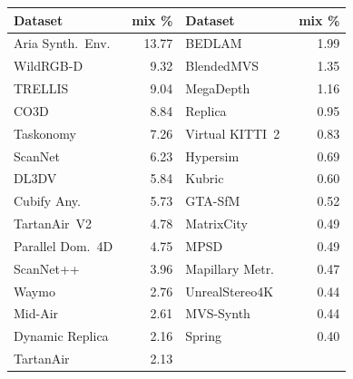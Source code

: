 \begingroup
\setlength{\tabcolsep}{3pt}
\begin{tabular}{@{}lr@{\hspace{0.8em}}lr@{}}
    \toprule
    \textbf{Dataset} & \textbf{mix \%} & \textbf{Dataset} & \textbf{mix \%} \\
    \midrule
    Aria Synth.\ Env.~\citep{avetisyan2024scenescript}                  & 13.77 & BEDLAM~\citep{black2023bedlam}                       & 1.99 \\
    WildRGB-D~\citep{xia2024wildrgbd}                                   &  9.32 & BlendedMVS~\citep{yao2020blendedmvs}                 & 1.35 \\
    TRELLIS~\citep{xiang2025trellis,deitke2023objaverse}                &  9.04 & MegaDepth~\citep{li2018megadepth}                    & 1.16 \\
    CO3D~\citep{reizenstein2021co3d}                                    &  8.84 & Replica~\citep{straub2019replica}                    & 0.95 \\
    Taskonomy~\citep{zamir2018taskonomy}                                &  7.26 & Virtual KITTI~2~\citep{cabon2020vkitti2}             & 0.83 \\
    ScanNet~\citep{dai2017scannet}                                      &  6.23 & Hypersim~\citep{roberts2021hypersim}                 & 0.69 \\
    DL3DV~\citep{ling2024dl3dv}                                         &  5.84 & Kubric~\citep{greff2022kubric}                       & 0.60 \\
    Cubify Any.~\citep{lazarow2025cubifyanything,baruch2021arkitscenes} &  5.73 & GTA-SfM~\citep{wang2020gtasfm}                       & 0.52 \\
    TartanAir~V2~\citep{wang2020tartanair}                              &  4.78 & MatrixCity~\citep{li2023matrixcity}                  & 0.49 \\
    Parallel Dom.\ 4D~\citep{vanhoorick2024gcd}                         &  4.75 & MPSD~\citep{lopez2020mpsd}                           & 0.49 \\
    ScanNet++~\citep{yeshwanth2023scannetpp}                            &  3.96 & Mapillary Metr.~\citep{mapillary2021metropolis}      & 0.47 \\
    Waymo~\citep{sun2020waymo}                                          &  2.76 & UnrealStereo4K~\citep{tosi2021smdnets}               & 0.44 \\
    Mid-Air~\citep{fonder2019midair}                                    &  2.61 & MVS-Synth~\citep{huang2018deepmvs}                   & 0.44 \\
    Dynamic Replica~\citep{karaev2023dynamicstereo}                     &  2.16 & Spring~\citep{mehl2023spring}                        & 0.40 \\
    TartanAir~\citep{wang2020tartanair}                                 &  2.13 &                                                      &      \\
    \bottomrule
\end{tabular}
\endgroup
